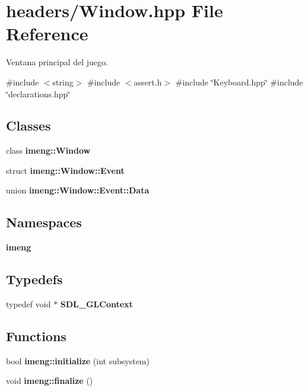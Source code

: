 \section{headers/\+Window.hpp File Reference}
\label{_window_8hpp}


Ventana principal del juego.  


{\ttfamily \#include $<$string$>$}\newline
{\ttfamily \#include $<$assert.\+h$>$}\newline
{\ttfamily \#include \char`\"{}Keyboard.\+hpp\char`\"{}}\newline
{\ttfamily \#include \char`\"{}declarations.\+hpp\char`\"{}}\newline
\subsection*{Classes}
\begin{DoxyCompactItemize}
\item 
class \textbf{ imeng\+::\+Window}
\item 
struct \textbf{ imeng\+::\+Window\+::\+Event}
\item 
union \textbf{ imeng\+::\+Window\+::\+Event\+::\+Data}
\end{DoxyCompactItemize}
\subsection*{Namespaces}
\begin{DoxyCompactItemize}
\item 
 \textbf{ imeng}
\end{DoxyCompactItemize}
\subsection*{Typedefs}
\begin{DoxyCompactItemize}
\item 
typedef void $\ast$ \textbf{ S\+D\+L\+\_\+\+G\+L\+Context}
\end{DoxyCompactItemize}
\subsection*{Functions}
\begin{DoxyCompactItemize}
\item 
bool \textbf{ imeng\+::initialize} (int subsystem)
\item 
void \textbf{ imeng\+::finalize} ()
\end{DoxyCompactItemize}


